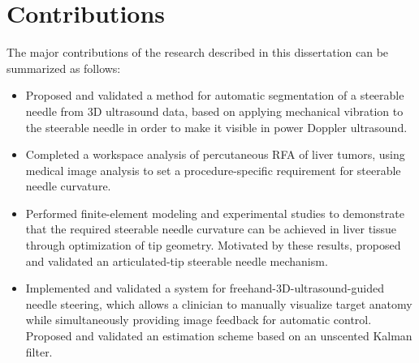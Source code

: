 \section{Contributions}
The major contributions of the research described in this dissertation can be summarized as follows:
\begin{itemize}
\item Proposed and validated a method for automatic segmentation of a steerable needle from 3D ultrasound data, based on applying mechanical vibration to the steerable needle in order to make it visible in power Doppler ultrasound.
\item Completed a workspace analysis of percutaneous RFA of liver tumors, using medical image analysis to set a procedure-specific requirement for steerable needle curvature.  
\item Performed finite-element modeling and experimental studies to demonstrate that the required steerable needle curvature can be achieved in liver tissue through optimization of tip geometry. Motivated by these results, proposed and validated an articulated-tip steerable needle mechanism.   
\item Implemented and validated a system for freehand-3D-ultrasound-guided needle steering, which allows a clinician to manually visualize target anatomy while simultaneously providing image feedback for automatic control. Proposed and validated an estimation scheme based on an unscented Kalman filter. 
\end{itemize}

